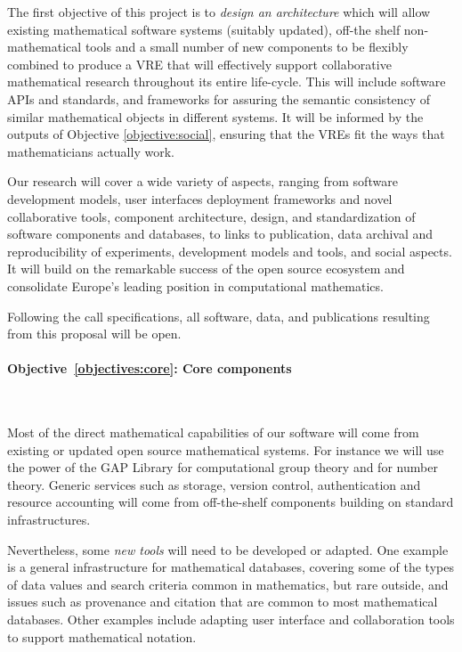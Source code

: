 \documentclass[noworkareas,deliverables,\classoptions]{euproposal}       %
\begin{document}
\begin{proposal}
The first objective of this project is to \emph{design an architecture} which
will allow existing mathematical software systems (suitably updated), 
off-the shelf non-mathematical tools and a small number of new
components to be flexibly combined to produce a VRE that will
effectively support collaborative mathematical research throughout
its entire life-cycle. This will include software APIs and standards,
and frameworks for assuring the semantic consistency of similar
mathematical objects in different systems.  It will be informed by the
outputs of Objective \ref{objective:social}, ensuring that the VREs
fit the ways that mathematicians actually work.


Our research will cover a wide variety of aspects, ranging from
software development models, user interfaces   deployment frameworks and novel collaborative tools,
component architecture, design, and standardization of software
components and databases, to links to publication, data archival and
reproducibility of experiments, development models and tools, and
social aspects. It will build on the remarkable success of the open
source ecosystem and consolidate Europe's leading position in
computational mathematics.

Following the call specifications, all software, data, and
publications resulting from this proposal will be open.



\paragraph{Objective~\ref{objectives:core}: Core components}\

Most of the direct mathematical capabilities of our software will come
from existing or updated open source mathematical systems. For instance we will
use the power of the GAP Library for computational group theory and
\PariGP for number theory. Generic services such as storage, version
control, authentication and resource accounting will come from
off-the-shelf components building on standard infrastructures.

Nevertheless, some \emph{new tools} will need to be developed or
adapted. One example is a general infrastructure for mathematical
databases, covering some of the types of data values and search
criteria common in mathematics, but rare outside, and issues such as
provenance and citation that are common to most mathematical
databases. Other examples include adapting user interface and
collaboration tools to support mathematical notation.





\end{proposal}
\end{document}
